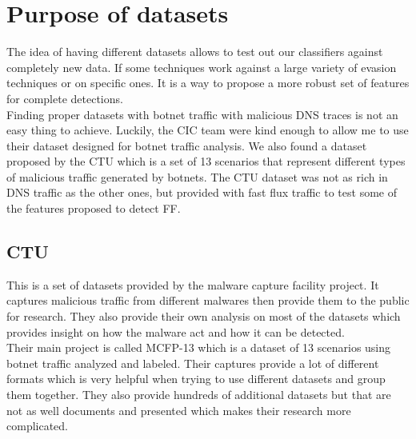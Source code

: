 \section{Purpose of datasets}
The idea of having different datasets allows to test out our classifiers against completely new data. If some techniques work against a large variety of evasion techniques or on specific ones. It is a way to propose a more robust set of features for complete detections.
\\
Finding proper datasets with botnet traffic with malicious DNS traces is not an easy thing to achieve. Luckily, the CIC team were kind enough to allow me to use their dataset designed for botnet traffic analysis. We also found a dataset proposed by the CTU which is a set of 13 scenarios that represent different types of malicious traffic generated by botnets. The CTU dataset was not as rich in DNS traffic as the other ones, but provided with fast flux traffic to test some of the features proposed to detect FF.

\subsection{CTU}
This is a set of datasets provided by the malware capture facility project\cite{CTU}. It captures malicious traffic from different malwares then provide them to the public for research. They also provide their own analysis on most of the datasets which provides insight on how the malware act and how it can be detected.\\
Their main project is called MCFP-13 which is a dataset of 13 scenarios using botnet traffic analyzed and labeled. Their captures provide a lot of different formats which is very helpful when trying to use different datasets and group them together. They also provide hundreds of additional datasets but that are not as well documents and presented which makes their research more complicated.

